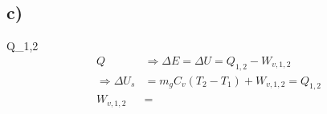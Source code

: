 

\subsection*{c)}
 Q_{1,2}
\begin{align*}
Q &\Rightarrow \Delta E = \Delta U = Q_{1,2} - W_{v,1,2} \\
\Rightarrow \Delta U_s &= m_g C_v (T_2 - T_1) + W_{v,1,2} = Q_{1,2} \\
W_{v,1,2} &= 
\end{align*}